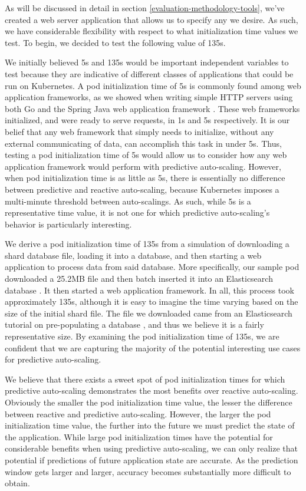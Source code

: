As will be discussed in detail in section \ref{evaluation-methodology-tools},
we've created a web server application that allows us to specify any
 we desire. As such, we have considerable flexibility with
respect to what initialization time values we test. To begin, we decided to test the
following value of 135s.

We initially believed 5s and 135s would be important independent variables to test because they
are indicative of different classes of applications that could be run on
Kubernetes. A pod initialization time of 5s is commonly found among web
application frameworks, as we showed when writing simple HTTP servers using
both Go and the Spring Java web application framework \cite{spring}. These web
frameworks initialized, and were ready to serve requests, in 1s and 5s
respectively. It is our belief that any web framework that simply
needs to initialize, without any external communicating of data, can
accomplish this task in under 5s. Thus, testing a pod initialization time of 5s
would allow us to consider how any web application framework would perform with
predictive auto-scaling. However, when pod initialization time is as little as
5s, there is essentially no difference between predictive and reactive
auto-scaling, because Kubernetes imposes a multi-minute threshold between auto-scalings.
As such, while 5s is a representative time value, it is not
one for which predictive auto-scaling's behavior is particularly interesting.

We derive a pod initialization time of 135s from a simulation of downloading a
shard database file, loading it into a database, and then starting a web
application to process data from said database. More specifically, our sample
pod downloaded a 25.2MB file and then batch inserted it into an Elasticsearch
database \cite{elasticsearch}. It then started a web application framework. In
all, this process took approximately 135s, although it is easy to imagine the
time varying based on the size of the initial shard file. The file we downloaded
came from an Elasticsearch tutorial on pre-populating a database
\cite{elasticsearch-import-some-data}, and thus we believe it is a fairly
representative size. By examining the pod initialization time of 135s, we
are confident that we are capturing the majority of the potential interesting use cases for
predictive auto-scaling.

We believe that there exists a sweet spot of pod initialization times
for which predictive auto-scaling demonstrates the most benefits over reactive
auto-scaling. Obviously the smaller the pod initialization time value, the lesser
the difference between reactive and predictive auto-scaling.
However, the larger the pod initialization time value, the further into
the future we must predict the state of the application. While large pod
initialization times have the potential for considerable benefits when using
predictive auto-scaling, we can only realize that potential if predictions of
future application state are accurate. As the prediction window gets larger and
larger, accuracy becomes substantially more difficult to obtain.
